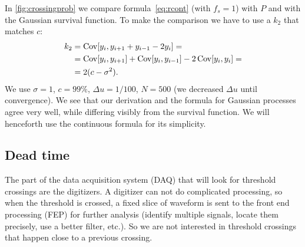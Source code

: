 In \autoref{fig:crossingprob} we compare formula~\eqref{eq:rcont} (with $f_s
= 1$) with $P$ and with the Gaussian survival function. To make the comparison
we have to use a $k_2$ that matches $c$:
%
\begin{align}
    k_2 &= \operatorname{Cov}[y_i, y_{i+1}+y_{i-1}-2y_i] = \notag \\
    &= \operatorname{Cov}[y_i,y_{i+1}]
    + \operatorname{Cov}[y_i,y_{i-1}]
    - 2 \operatorname{Cov}[y_i,y_i] = \notag \\
    &= 2 (c - \sigma^2). \label{eq:c2k2}
\end{align}
%
We use $\sigma=1$, $c = \SI{99}\%$, $\Delta u = 1/100$, $N=500$ (we decreased
$\Delta u$ until convergence). We see that our derivation and the formula
for Gaussian processes agree very well, while differing visibly from the
survival function. We will henceforth use the continuous formula for its
simplicity.


\begin{figure}
    

    
\end{figure}

\subsection{Dead time}

The part of the data acquisition system (DAQ) that will look for threshold
crossings are the digitizers. A digitizer can not do complicated processing, so
when the threshold is crossed, a fixed slice of waveform is sent to the front
end processing (FEP) for further analysis (identify multiple signals, locate
them precisely, use a better filter, etc.). So we are not interested in
threshold crossings that happen close to a previous crossing.

